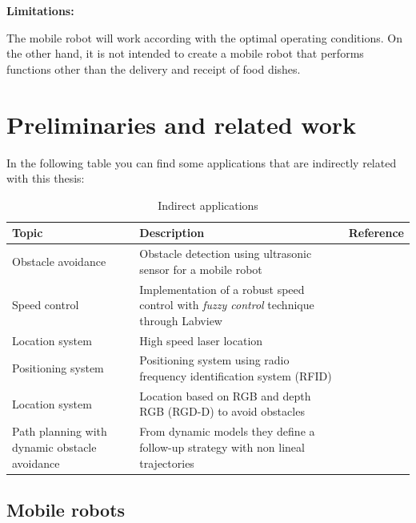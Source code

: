 \textbf{Limitations:}

The mobile robot will work according with the optimal operating conditions. On the other hand, it is not intended to create a mobile robot that performs functions other than the delivery and receipt of food dishes.

\cleardoublepage
\chapter{Preliminaries and related work}
In the following table you can find some applications that are indirectly related with this thesis:

\begin{center}
\begin{table}[h!]
\caption{Indirect applications}
\centering{}%
\begin{tabular}{>{\raggedright}p{4cm}>{\raggedright}p{4cm}>{\raggedright}p{4cm}}
\hline 
\raggedright{}Topic & \raggedright{}Description & \raggedright{}Reference\tabularnewline
\hline 
\raggedright{}Obstacle avoidance  & \raggedright{}Obstacle detection using ultrasonic sensor for a mobile robot & \raggedright{}\citep{azeta2019obstacle}\tabularnewline
\hline 
\raggedright{}Speed control & \raggedright{}Implementation of a robust speed control with \textit{fuzzy control} technique
through Labview & \raggedright{}\citep{abril2012analisis}\tabularnewline
\hline 
\raggedright{}Location system & \raggedright{}High speed laser location & \raggedright{}\citep{tzou2009high}\tabularnewline
\hline 
\raggedright{}Positioning system & \raggedright{}Positioning system using radio frequency identification system (RFID)  & \raggedright{}\citep{qing2010research}\tabularnewline
\hline 
\raggedright{}Location system & \raggedright{}Location based on RGB and depth RGB (RGD-D) to avoid obstacles & \raggedright{}\citep{yuan2016rgb}\tabularnewline
\hline 
\raggedright{}Path planning with dynamic obstacle avoidance & \raggedright{}From dynamic models they define a follow-up strategy with non lineal trajectories  & \raggedright{}\citep{arcos2019optimal}\tabularnewline
\hline 
\end{tabular}
\end{table}
\par\end{center}


\section{Mobile robots}


